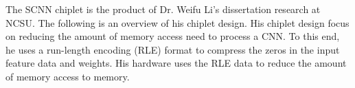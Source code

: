 \documentclass[../main.tex]{subfiles}
\begin{document}
The SCNN chiplet is the product of Dr. Weifu Li's dissertation research at NCSU. The following is an overview of his chiplet design\cite{LeWeifuDissertation}. His chiplet design focus on reducing the amount of memory access need to process a CNN. To this end, he uses a run-length encoding (RLE) format to compress the zeros in the input feature data and weights. His hardware uses the RLE data to reduce the amount of memory access to memory.
\end{document}
